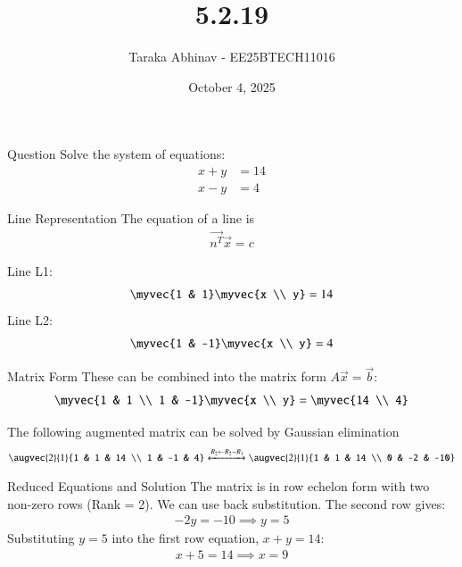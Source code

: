 \documentclass{beamer}
\title{5.2.19}
\date{October 4, 2025}
\author{Taraka Abhinav - EE25BTECH11016}
\begin{document}
\frame{\titlepage}
\begin{frame}{Question}
Solve the system of equations:
\begin{align}
x + y &= 14 \\
x - y &= 4
\end{align}
\end{frame}

\begin{frame}{Line Representation}
The equation of a line is
\begin{align}
\vec{n^T}\vec{x} = c
\end{align}

Line L1:
\begin{align}
\myvec{1 & 1}\myvec{x \\ y}=14
\end{align}
Line L2:
\begin{align}
\myvec{1 & -1}\myvec{x \\ y}=4
\end{align}
\end{frame}
\begin{frame}{Matrix Form}
These can be combined into the matrix form $A\vec{x}=\vec{b}$:
\begin{align}
\myvec{1 & 1 \\ 1 & -1}\myvec{x \\ y} = \myvec{14 \\ 4}
\end{align}

The following augmented matrix can be solved by Gaussian elimination 
\begin{align}
\augvec{2}{1}{1 & 1 & 14 \\ 1 & -1 & 4} 
\xleftrightarrow{R_2 \leftarrow R_2 - R_1} 
\augvec{2}{1}{1 & 1 & 14 \\ 0 & -2 & -10}
\end{align}
\end{frame}

\begin{frame}{Reduced Equations and Solution}
The matrix is in row echelon form with two non-zero rows (Rank = 2). We can use back substitution. The second row gives:
\begin{align}
-2y = -10 \implies y = 5
\end{align}
Substituting $y=5$ into the first row equation, $x+y=14$:
\begin{align}
x + 5 = 14 \implies x = 9
\end{align}
\end{frame}
\end{document}
